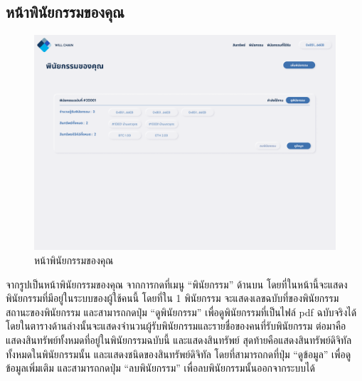 \documentclass[12pt,oneside,openright,a4paper]{cpe-thai-project}
\begin{document}
\subsection{หน้าพินัยกรรมของคุณ}
		\begin{figure}[!thb]
			\centering
			\includegraphics[scale=0.2]{userWill}
			\caption{หน้าพินัยกรรมของคุณ}
		\end{figure}
		\FloatBarrier
		\tab จากรูปเป็นหน้าพินัยกรรมของคุณ จากการกดที่เมนู “พินัยกรรม” ด้านบน โดยที่ในหน้านี้จะแสดงพินัยกรรมที่มีอยู่ในระบบของผู้ใช้คนนี้ โดยที่ใน 1 พินัยกรรม จะแสดงเลขฉบับที่ของพินัยกรรม สถานะของพินัยกรรม และสามารถกดปุ่ม “ดูพินัยกรรม” เพื่อดูพินัยกรรมที่เป็นไฟล์ pdf ฉบับจริงได้ โดยในตารางด้านล่างนั้นจะแสดงจำนวนผู้รับพินัยกรรมและรายชื่อของคนที่รับพินัยกรรม ต่อมาคือแสดงสินทรัพย์ทั้งหมดที่อยู่ในพินัยกรรมฉบับนี้ และแสดงสินทรัพย์ สุดท้ายคือแสดงสินทรัพย์ดิจิทัลทั้งหมดในพินัยกรรมนั้น และแสดงชนิดของสินทรัพย์ดิจิทัล โดยที่สามารถกดที่ปุ่ม “ดูข้อมูล” เพื่อดูข้อมูลเพิ่มเติม และสามารถกดปุ่ม “ลบพินัยกรรม” เพื่อลบพินัยกรรมนั้นออกจากระบบได้
\end{document}
